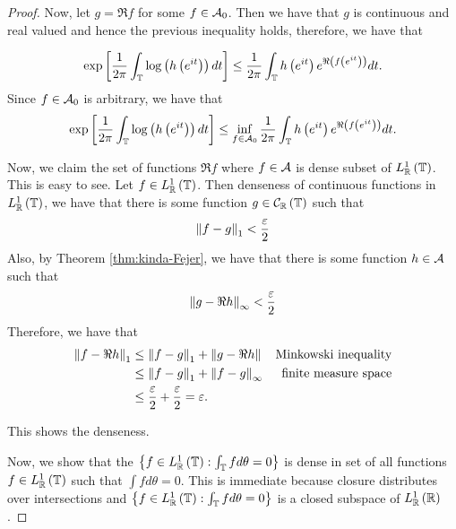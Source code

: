 \begin{proof}
    Now, let $g=\Re f$ for some $f\in {\cal A}_{0}$. Then we have that $g$ is continuous and real valued and hence the previous inequality holds, therefore, we have that 

    \begin{equation*}
	\exp\left[ \frac{1}{2\pi} \int_{\mathbb T} \log \left( h\left( e^{it} \right) \right) dt  \right] \le \frac{1}{2\pi} \int_{\mathbb T} h\left( e^{it} \right) e^{\Re \left( f\left( e^{it} \right) \right)} dt \text{.}
    \end{equation*}
    Since $f \in {\cal A}_{0}$ is arbitrary, we have that 
    \begin{equation*}
	\exp\left[ \frac{1}{2\pi} \int_{\mathbb T} \log \left( h\left( e^{it} \right) \right) dt  \right] \le \inf_{f\in{\cal A}_{0}} \frac{1}{2\pi} \int_{\mathbb T} h\left( e^{it} \right) e^{\Re \left( f\left( e^{it} \right) \right)} dt \text{.}
    \end{equation*}

    Now, we claim the set of functions $\Re f$ where $f\in {\cal A}$ is dense subset of $L^{1}_{\mathbb R}\left( \mathbb T \right)$. This is easy to see. Let $f\in L^{1}_{\mathbb R} \left( \mathbb T \right)$. Then denseness of continuous functions in $L^{1} _{\mathbb R}\left( \mathbb T \right)$, we have that there is some function $g\in {\cal C} _{\mathbb R} \left( \mathbb T \right)$ such that 
    \begin{align*}
	\left\lVert f-g \right\rVert_{1} < \frac{\varepsilon}{2}
    \end{align*}
    Also, by Theorem \ref{thm:kinda-Fejer}, we have that there is some function $h\in {\cal A}$ such that 
    \begin{align*}
	\left\lVert g-\Re h \right\rVert_{\infty} < \frac{\varepsilon}{2}
    \end{align*}
    Therefore, we have that
    \begin{align*}
	\left\lVert f-\Re h \right\rVert_{1} & \le \left\lVert f-g \right\rVert_{1} + \left\lVert g-\Re h \right\rVert & \text{Minkowski inequality} \\
	& \le \left\lVert f-g \right\rVert_{1} + \left\lVert f-g \right\rVert_{\infty} & \text{finite measure space} \\
	& \le \frac{\varepsilon}{2} + \frac{\varepsilon}{2} = \varepsilon\text{.}
    \end{align*}

    This shows the denseness.

    Now, we show that the $\left\{ f\in L^{1}_{\mathbb R} \left( \mathbb T \right) : \int_{\mathbb T} f d\theta = 0 \right\}$ is dense in set of all functions $f \in L^{1}_{\mathbb R} \left( \mathbb T \right)$ such that $\int f d\theta = 0$. This is immediate because closure distributes over intersections and $\left\{ f\in L^{1}_{\mathbb R} \left( \mathbb T \right) : \int_{\mathbb T} f d\theta = 0 \right\}$ is a closed subspace of $L^{1}_{\mathbb R} \left( \mathbb R \right)$.


\end{proof}
